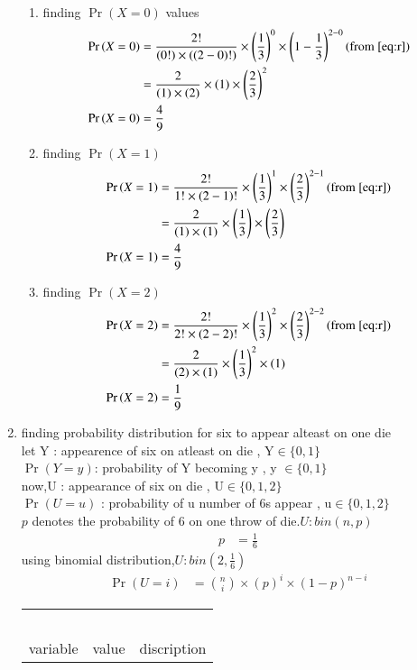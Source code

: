 \documentclass[journal,12pt,onecolumn]{IEEEtran}
\providecommand{\pr}[1]{\ensuremath{\Pr\left(#1\right)}}
\providecommand{\brak}[1]{\ensuremath{\left(#1\right)}}
\theoremstyle{remark}
\begin{document}
\begin{enumerate}
\begin{enumerate}
\item finding $\pr{X=0}$ values
\begin{align}
\pr{X=0}&=\frac{2!}{(0!)\times((2-0)!)}\times\brak{\frac{1}{3}}^0\times\brak{1-\frac{1}{3}}^{2-0} (\text{from } \eqref{eq:r})\\
&= \frac{2}{(1)\times(2)}\times(1)\times\brak{\frac{2}{3}}^{2}    \\
\pr{X=0}&=\frac{4}{9}
\end{align}
\item finding $\pr{X=1}$
\begin{align}
\pr{X=1}&=\frac{2!}{1!\times(2-1)!}\times\brak{\frac{1}{3}}^{1}\times\brak{\frac{2}{3}}^{2-1}(\text{from } \eqref{eq:r})\\
&=\frac{2}{(1)\times(1)}\times\brak{\frac{1}{3}}\times\brak{\frac{2}{3}}\\
\pr{X=1}&=\frac{4}{9}
\end{align}
\item finding $\pr{X=2}$
\begin{align}
\pr{X=2}&=\frac{2!}{2!\times(2-2)!}\times\brak{\frac{1}{3}}^{2}\times\brak{\frac{2}{3}}^{2-2}(\text{from } \eqref{eq:r})\\
&= \frac{2}{(2)\times(1)}\times\brak{\frac{1}{3}}^{2}\times(1)    \\
\pr{X=2}&=\frac{1}{9}
\end{align}
\end{enumerate}
\item finding probability distribution for six to appear alteast on one die\\
let Y : appearence of six on atleast on die , Y$\in \{0,1\}$\\
$\pr{Y=y}$: probability of Y becoming y , y $\in \{ 0,1\}$ \\
now,U : appearance of six on die , U$\in \{0,1,2\}$\\
$\pr{U=u}$ : probability of u number of 6s appear  , u$\in \{0,1,2\}$\\
$p$ denotes the probability of 6 on one throw of die.$U:bin(n,p)$
\begin{align}
 p&=\frac{1}{6} 
\end{align}
using binomial distribution,$U:bin(2,\frac{1}{6})$ \label{eq:cot}
\begin{align}
\pr{U=i}&={n \choose i}\times(p)^i\times(1-p)^{n-i} \label{eq:tat}
\end{align} 
\begin{tabular}{|l|l|l|}
\hline
\ &\ &\  \\
\large variable & \large value & \large discription \\

\end{tabular}
\end{enumerate}
\end{document}
